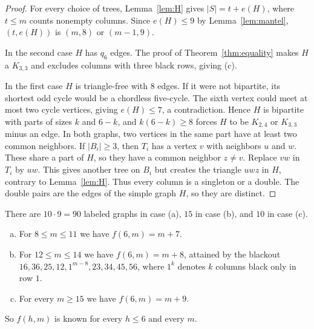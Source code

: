 \begin{proof}
For every choice of trees, Lemma~\ref{lem:H} gives $|S|=t+e(H)$,
where $t\le m$ counts nonempty columns. Since $e(H)\le9$ by
Lemma~\ref{lem:mantel}, $(t,e(H))$ is $(m,8)$ or $(m-1,9)$.

In the second case $H$ has $q_6$ edges. The proof of Theorem~\ref{thm:equality}
makes $H$ a $K_{3,3}$ and excludes columns with three black rows, giving (c).

In the first case $H$ is triangle-free with $8$ edges. If it were not bipartite,
its shortest odd cycle would be a chordless five-cycle. The sixth vertex could meet
at most two cycle vertices, giving $e(H)\le7$, a contradiction. Hence $H$ is bipartite with parts of sizes
$k$ and $6-k$, and $k(6-k)\ge8$ forces $H$ to be $K_{2,4}$ or $K_{3,3}$ minus an edge. In both
graphs, two vertices in the same part have at least two common neighbors.
If $|B_i|\ge3$, then $T_i$ has a vertex $v$ with neighbors $u$ and $w$.
These share a part of $H$, so they have a common neighbor $z\ne v$.
Replace $vw$ in $T_i$ by $uw$. This gives another tree on $B_i$ but creates
the triangle $uwz$ in $H$, contrary to Lemma~\ref{lem:H}.
Thus every column is a singleton or a double. The double pairs are the edges
of the simple graph $H$, so they are distinct.
\end{proof}

There are $10\cdot9=90$ labeled graphs in case (a), $15$ in case (b), and $10$ in case (c).

\begin{theorem}\label{thm:sixrow}
\leavevmode
\begin{enumerate}[(a)]
\item For $8\le m\le11$ we have $f(6,m)=m+7$.
\item For $12\le m\le14$ we have $f(6,m)=m+8$, attained by the blackout
$16,\allowbreak 36,\allowbreak 25,\allowbreak 12,\allowbreak 1^{m-8},\allowbreak 23,\allowbreak 34,\allowbreak 45,\allowbreak 56$, where $1^{k}$ denotes $k$
columns black only in row $1$.
\item For every $m\ge15$ we have $f(6,m)=m+9$.
\end{enumerate}
So $f(h,m)$ is known for every $h\le6$ and every $m$.
\end{theorem}

